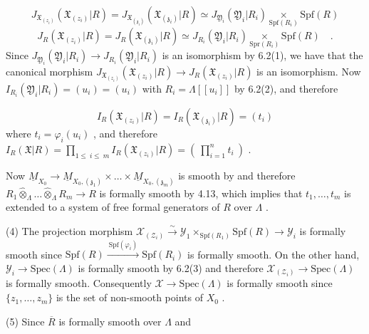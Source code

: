 \begin{equation*}
J_{\mathfrak{X}_{(z_i)}}(\mathfrak{X}_{(z_i)}|R) = J_{\mathfrak{X}_{(\mathfrak{z}_i)}}(\mathfrak{X}_{(\mathfrak{z}_i)}|R) \simeq J_{\mathfrak{Y}_i}(\mathfrak{Y}_i|R_i) \underset{\mathrm{Spf}(R_i)}{\times} \mathrm{Spf}(R)
\end{equation*}
\begin{equation*}
J_R(\mathfrak{X}_{(z_i)}|R) = J_R(\mathfrak{X}_{(\mathfrak{z}_i)}|R) \simeq J_{R_i}(\mathfrak{Y}_i|R_i) \underset{\mathrm{Spr}(R_i)}{\times} \mathrm{Spf}(R) \quad .
\end{equation*}
Since $J_{\mathfrak{Y}_i}(\mathfrak{Y}_i|R_i) \to J_{R_i}(\mathfrak{Y}_i|R_i)$ is an isomorphism by 6.2(1), we have that the canonical morphism $J_{\mathfrak{X}_{(z_i)}}(\mathfrak{X}_{(z_i)}|R) \to J_R(\mathfrak{X}_{(z_i)}|R)$ is an isomorphism. Now $I_{R_i}(\mathfrak{Y}_i|R_i) = (u_i) = (u_i)$ with $R_i = \Lambda[[u_i]]$ by 6.2(2), and therefore

\begin{equation*}
I_R(\mathfrak{X}_{(z_i)}|R) = I_R(\mathfrak{X}_{(\mathfrak{z}_i)}|R) = (t_i)
\end{equation*}
where $t_i = \varphi_i(u_i)$ , and therefore $I_R(\mathfrak{X}|R) = \prod_{1\leq\ i\leq\ m} I_R(\mathfrak{X}_{(z_i)}|R) = (\ \prod_{i=1}^{n} t_i\ )$ .

Now $\underline{M}_{X_0} \to \underline{M}_{X_0,(\mathfrak{z}_1)} \times \ldots \times \underline{M}_{X_0,(\mathfrak{z}_m)}$ is smooth by and therefore $R_1 \hat{\otimes}_{\Lambda} \ldots \hat{\otimes}_{\Lambda} R_m \to R$ is formally smooth by 4.13, which implies that $t_1,\ldots,t_m$ is extended to a system of free formal generators of $R$ over $\Lambda$ .



(4)  The projection morphism  $\mathcal{X}_{(\mathcal{Z}_i)} \overset{\sim}{\rightarrow} \mathcal{Y}_1 \times_{\mathrm{Spf}(R_1)} \mathrm{Spf}(R) \rightarrow \mathcal{Y}_i$  is formally smooth since  $\mathrm{Spf}(R) \xrightarrow{\ \mathrm{Spf}(\varphi_i)\ } \mathrm{Spf}(R_i)$  is formally smooth. On the other hand, $\mathcal{Y}_i \rightarrow \mathrm{Spec}(\Lambda)$  is formally smooth by 6.2(3)  and therefore  $\mathcal{X}_{(\mathcal{Z}_i)} \rightarrow \mathrm{Spec}(\Lambda)$  is formally smooth. Consequently  $\mathcal{X} \rightarrow \mathrm{Spec}(\Lambda)$  is formally smooth since  $\{z_1,\dots,z_m\}$  is the set of non-smooth points of  $X_0$ .

(5)  Since  $\overline{R}$  is formally smooth over  $\Lambda$  and

